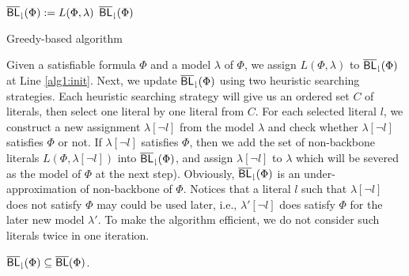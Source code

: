 \begin{algorithm}
\SetAlgoShortEnd
\SetFillComment
{}
${\sf \overline{BL}_\downharpoonright}(\Phi):=L(\Phi,\lambda)$\; \label{alg1:init}
\For{${\sf HS}$ from ${\sf HS}_1$ to ${\sf HS}_2$}{
    $C:={\sf HS}(\Phi)$\;
    $i:=0$\;
    \While{$i<|C|$}{
        $i:=i+1$,  $l:=C[i]$\;
        \If{$\lambda[\neg l]\models \Phi$}
        {
           $\NBLap(\Phi):=\NBLap(\Phi)\cup L(\Phi,\lambda[\neg l])$\;
           $\lambda:=\lambda[\neg l]$\;
        }
}

}\label{alg1:loopend}
\Return ${\sf \overline{BL}_\downharpoonright}(\Phi)$\;
\caption{Greedy-based algorithm}
\label{alg:greedy}
\end{algorithm}
Given a satisfiable formula $\Phi$ and a model $\lambda$ of $\Phi$,
we assign $L(\Phi,\lambda)$ to ${\sf \overline{BL}_\downharpoonright}(\Phi)$ at Line \ref{alg1:init}. Next, we update
${\sf \overline{BL}_\downharpoonright}(\Phi)$ using two heuristic searching strategies. %
Each heuristic searching strategy will give us an ordered set $C$ of literals, then select one literal by one literal from
$C$. For each selected literal $l$, we construct a new assignment $\lambda[\neg l]$ from the model
$\lambda$ and check whether  $\lambda[\neg l]$ satisfies $\Phi$ or not.
If $\lambda[\neg l]$ satisfies $\Phi$, then we add the set of non-backbone literals $L(\Phi,\lambda[\neg l])$ into ${\sf \overline{BL}_\downharpoonright}(\Phi)$, and
assign $\lambda[\neg l]$ to $\lambda$ which will be severed as the model of $\Phi$ at the next step).
Obviously,  ${\sf \overline{BL}_\downharpoonright}(\Phi)$ is an under-approximation of non-backbone of $\Phi$.
Notices that a literal $l$ such that $\lambda[\neg l]$ does not satisfy $\Phi$ may could be used 
later, i.e., $\lambda'[\neg l]$ does satisfy $\Phi$ for the later new model $\lambda'$. To make the algorithm efficient,
we do not consider such literals twice in one iteration. 

\begin{theorem}
${\sf \overline{BL}_\downharpoonright}(\Phi)\subseteq\overline{\textsf{BL}}(\Phi)$.
\end{theorem}

